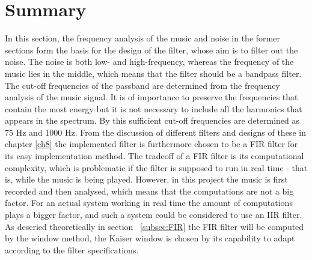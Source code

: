 \section{Summary} \label{sec:filtervalg}
In this section, the frequency analysis of the music and noise in the former sections form the basis for the design of the filter, whose aim is to filter out the noise. The noise is both low- and high-frequency, whereas the frequency of the music lies in the middle, which means that the filter should be a bandpass filter. The cut-off frequencies of the passband are determined from the frequency analysis of the music signal. It is of importance to preserve the frequencies that contain the most energy but it is not necessary to include all the harmonics that appears in the spectrum. By this sufficient cut-off frequencies are determined as 75 Hz and 1000 Hz.   
From the discussion of different filters and designs of these in chapter \ref{ch8} the implemented filter is furthermore chosen to be a FIR filter for its easy implementation method. The tradeoff of a FIR filter is its computational complexity, which is problematic if the filter is supposed to run in real time - that is, while the music is being played. However, in this project the music is first recorded and then analysed, which means that the computations are not a big factor. For an actual system working in real time the amount of computations plays a bigger factor, and such a system could be considered to use an IIR filter.\\
As descried theoretically in section ~\ref{subsec:FIR} the FIR filter will be computed by the window method, the Kaiser window is chosen by its capability to adapt according to the filter specifications.     